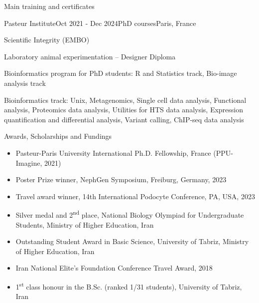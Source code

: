 \documentclass[
	11pt, %
]{resume} %
\begin{document}

\begin{rSection}{Main training and certificates}

	\begin{rSubsection}{Pasteur Institute}{Oct 2021 - Dec 2024}{PhD courses}{Paris, France}
		\item Scientific Integrity (EMBO)
		\item Laboratory animal experimentation – Designer Diploma
		\item Bioinformatics program for PhD students: R and Statistics track, Bio-image
analysis track
		\item Bioinformatics track: Unix, Metagenomics, Single cell data analysis, Functional analysis, Proteomics data
analysis, Utilities for HTS data analysis, Expression quantification and differential analysis, Variant
calling, ChIP-seq data analysis
	\end{rSubsection}
	
\end{rSection}


\begin{rSection}{Awards, Scholarships and Fundings}

\begin{itemize}
  \item Pasteur-Paris University International Ph.D. Fellowship, France (PPU-Imagine, 2021)
  \item Poster Prize winner, NephGen Symposium, Freiburg, Germany, 2023
  \item Travel award winner, 14th International Podocyte Conference, PA, USA, 2023
  \item Silver medal and 2\textsuperscript{nd} place, National Biology Olympiad for Undergraduate Students, 
        Ministry of Higher Education, Iran
  \item Outstanding Student Award in Basic Science, University of Tabriz, Ministry of Higher Education, Iran
  \item Iran National Elite’s Foundation Conference Travel Award, 2018
  \item 1\textsuperscript{st} class honour in the B.Sc. (ranked 1/31 students), University of Tabriz, Iran
\end{itemize}

\end{rSection}
\end{document}
